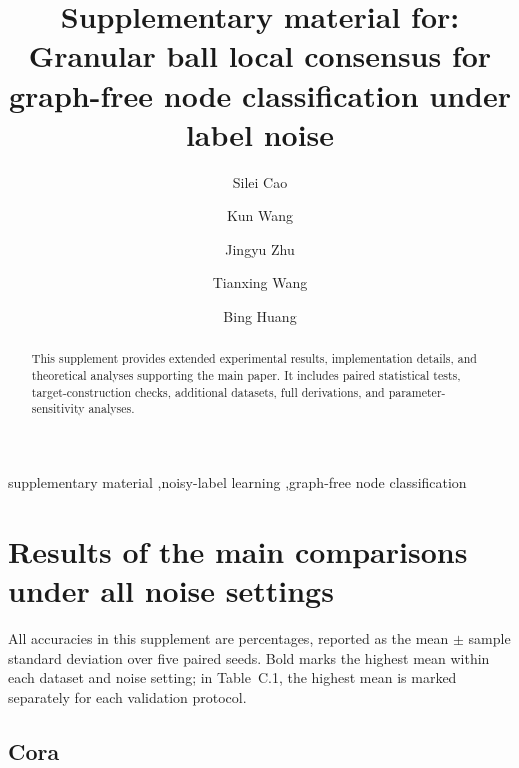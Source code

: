 \documentclass[a4paper,fleqn]{cas-sc}
\begin{document}
\let\WriteBookmarks\relax
\def\floatpagepagefraction{1}
\def\textpagefraction{.001}
\title[mode = title]{Supplementary material for: Granular ball local consensus for graph-free node classification under label noise}
\author[1]{Silei Cao}
\author[1]{Kun Wang}
\author[2]{Jingyu Zhu}
\author[3]{Tianxing Wang}
\author[1]{Bing Huang}
\cormark[1]
\begin{abstract}
This supplement provides extended experimental results, implementation details, and theoretical analyses supporting the main paper. It includes paired statistical tests, target-construction checks, additional datasets, full derivations, and parameter-sensitivity analyses.
\end{abstract}
\begin{keywords}
supplementary material \sep noisy-label learning \sep graph-free node classification
\end{keywords}

\maketitle
\appendix
\renewcommand{\thetable}{\Alph{section}.\arabic{table}}
\renewcommand{\theHtable}{\Alph{section}.\arabic{table}}
\setcounter{table}{0}
\section{Results of the main comparisons under all noise settings}\label{sec:A}

All accuracies in this supplement are percentages, reported as the mean \(\pm\) sample standard deviation over five paired seeds. Bold marks the highest mean within each dataset and noise setting; in Table~C.1, the highest mean is marked separately for each validation protocol.


\subsection{Cora}\label{sec:A.1}
\end{document}
